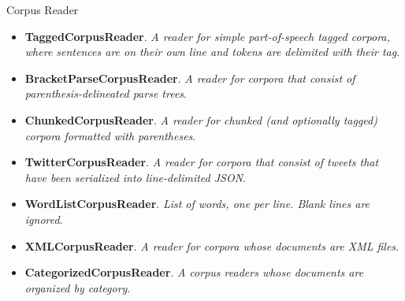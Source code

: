 \documentclass[11pt]{beamer}
\begin{document}
\begin{frame}{Corpus Reader}
	\begin{itemize}
		\item \textbf{TaggedCorpusReader}. \textit{A reader for simple part-of-speech tagged corpora, where sentences are on their own line and tokens are delimited with their tag}. 
		\item \textbf{BracketParseCorpusReader}. \textit{A reader for corpora that consist of parenthesis-delineated parse trees}.
		\item \textbf{ChunkedCorpusReader}. \textit{A reader for chunked (and optionally tagged) corpora formatted with parentheses}.
		\item \textbf{TwitterCorpusReader}. \textit{A reader for corpora that consist of tweets that have been serialized into line-delimited JSON}.
		\item \textbf{WordListCorpusReader}. \textit{List of words, one per line. Blank lines are ignored}. 
		\item \textbf{XMLCorpusReader}. \textit{A reader for corpora whose documents are XML files}. 
		\item \textbf{CategorizedCorpusReader}. \textit{A corpus readers whose documents are organized by category}.
	\end{itemize}
\end{frame}
\end{document}
